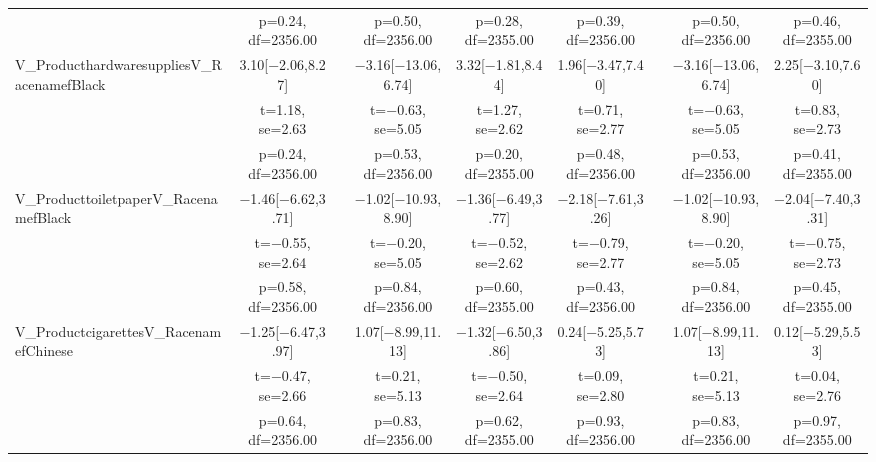 \documentclass[]{report}
\begin{document}
\begin{table}
{\begin{tabular}[t]{lcccccccc}
		& p=\num{0.24}, df=\num{2356.00} &  & p=\num{0.50}, df=\num{2356.00} & p=\num{0.28}, df=\num{2355.00} & p=\num{0.39}, df=\num{2356.00} &  & p=\num{0.50}, df=\num{2356.00} & p=\num{0.46}, df=\num{2355.00}\\
		V\_ProducthardwaresuppliesV\_RacenamefBlack & \num{3.10}[\num{-2.06},\num{8.27}] &  & \num{-3.16}[\num{-13.06},\num{6.74}] & \num{3.32}[\num{-1.81},\num{8.44}] & \num{1.96}[\num{-3.47},\num{7.40}] &  & \num{-3.16}[\num{-13.06},\num{6.74}] & \num{2.25}[\num{-3.10},\num{7.60}]\\
		& t=\num{1.18}, se=\num{2.63} &  & t=\num{-0.63}, se=\num{5.05} & t=\num{1.27}, se=\num{2.62} & t=\num{0.71}, se=\num{2.77} &  & t=\num{-0.63}, se=\num{5.05} & t=\num{0.83}, se=\num{2.73}\\
		& p=\num{0.24}, df=\num{2356.00} &  & p=\num{0.53}, df=\num{2356.00} & p=\num{0.20}, df=\num{2355.00} & p=\num{0.48}, df=\num{2356.00} &  & p=\num{0.53}, df=\num{2356.00} & p=\num{0.41}, df=\num{2355.00}\\
		V\_ProducttoiletpaperV\_RacenamefBlack & \num{-1.46}[\num{-6.62},\num{3.71}] &  & \num{-1.02}[\num{-10.93},\num{8.90}] & \num{-1.36}[\num{-6.49},\num{3.77}] & \num{-2.18}[\num{-7.61},\num{3.26}] &  & \num{-1.02}[\num{-10.93},\num{8.90}] & \num{-2.04}[\num{-7.40},\num{3.31}]\\
		& t=\num{-0.55}, se=\num{2.64} &  & t=\num{-0.20}, se=\num{5.05} & t=\num{-0.52}, se=\num{2.62} & t=\num{-0.79}, se=\num{2.77} &  & t=\num{-0.20}, se=\num{5.05} & t=\num{-0.75}, se=\num{2.73}\\
		& p=\num{0.58}, df=\num{2356.00} &  & p=\num{0.84}, df=\num{2356.00} & p=\num{0.60}, df=\num{2355.00} & p=\num{0.43}, df=\num{2356.00} &  & p=\num{0.84}, df=\num{2356.00} & p=\num{0.45}, df=\num{2355.00}\\
		V\_ProductcigarettesV\_RacenamefChinese & \num{-1.25}[\num{-6.47},\num{3.97}] &  & \num{1.07}[\num{-8.99},\num{11.13}] & \num{-1.32}[\num{-6.50},\num{3.86}] & \num{0.24}[\num{-5.25},\num{5.73}] &  & \num{1.07}[\num{-8.99},\num{11.13}] & \num{0.12}[\num{-5.29},\num{5.53}]\\
		& t=\num{-0.47}, se=\num{2.66} &  & t=\num{0.21}, se=\num{5.13} & t=\num{-0.50}, se=\num{2.64} & t=\num{0.09}, se=\num{2.80} &  & t=\num{0.21}, se=\num{5.13} & t=\num{0.04}, se=\num{2.76}\\
		& p=\num{0.64}, df=\num{2356.00} &  & p=\num{0.83}, df=\num{2356.00} & p=\num{0.62}, df=\num{2355.00} & p=\num{0.93}, df=\num{2356.00} &  & p=\num{0.83}, df=\num{2356.00} & p=\num{0.97}, df=\num{2355.00}\\

\end{tabular}}
\end{table}
\end{document}
